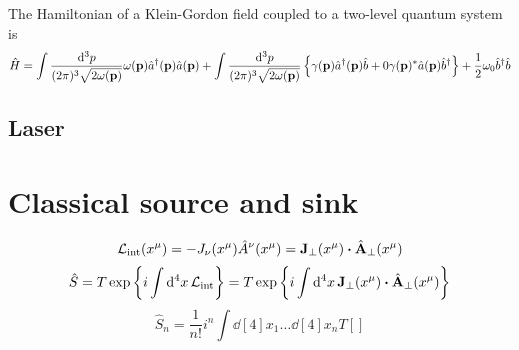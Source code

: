 \begin{example}
	The Hamiltonian of a Klein-Gordon field coupled to a two-level quantum system is
	\begin{equation}
		\hat{H}
		=
		\int\frac{\dd[3]{p}}{(2\pi)^3\sqrt{2\omega(\vb{p})}}
		\omega(\vb{p})
		\hat{a}^\dagger(\vb{p})
		\hat{a}(\vb{p})
		+
		\int\frac{\dd[3]{p}}{(2\pi)^3\sqrt{2\omega(\vb{p})}}
		\left\{
			\gamma(\vb{p})
			\hat{a}^\dagger(\vb{p})
			\hat{b}
			+0
			\gamma(\vb{p})^*
			\hat{a}(\vb{p})
			\hat{b}^\dagger
		\right\}
		+
		\frac{1}{2}
		\omega_0
		\hat{b}^\dagger
		\hat{b}
	\end{equation}
\end{example}

\subsection{Laser}

\section{Classical source and sink}

\begin{equation}
	\mathcal{L}_\text{int}(x^\mu)
	=
	-
	J_\nu(x^\mu)
	\hat{A}^\nu(x^\mu)
	=
	\vb{J}_\perp(x^\mu)
	\vdot
	\hat{\vb{A}}_\perp(x^\mu)
\end{equation}
\begin{equation}
	\hat{S}
	=
	T
	\exp\left\{
		i
		\int\dd[4]{x}
		\mathcal{L}_\text{int}
	\right\}
	=
	T
	\exp\left\{
		i
		\int\dd[4]{x}
		\vb{J}_\perp(x^\mu)
		\vdot
		\hat{\vb{A}}_\perp(x^\mu)
	\right\}
\end{equation}
\begin{equation}
	\hat{S}_n
	=
	\frac{1}{n!}
	i^n
	\int\dd[4]{x_1}\dots\dd[4]{x_n}
	T\left[\right]
\end{equation}